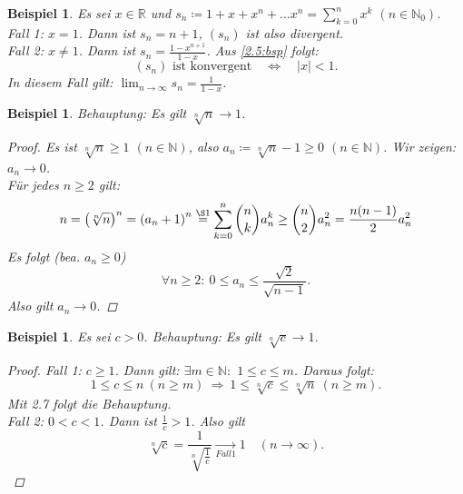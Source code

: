 \documentclass[12pt]{extreport} %
\newcommand{\N}{\mathbb{N}}
\newcommand{\R}{\mathbb{R}}
\theoremstyle{named}
\theoremstyle{itshape}
\theoremstyle{normal}
\newtheorem{beispiel}[unnamedtheorem]{Beispiel}
\begin{document}
\begin{beispiel} \label{2.6:bsp}
	Es sei $x \in \R$ und $s_{n} \coloneqq 1 + x + x^{n} + \dotsc x^{n} = \sum_{k = 0}^{n} x^{k}$ $(n \in \N_0)$. \\
	Fall 1: $x = 1$. Dann ist $s_{n} = n + 1$, $(s_{n})$ ist also divergent. \\
	Fall 2: $x \neq 1$. Dann ist  $s_{n} = \frac{1 - x^{n+1}}{1 - x}$. Aus \ref{2.5:bsp} folgt:
	$$
		(s_{n}) \text{ ist konvergent} \quad \iff \quad |x| < 1.
	$$
	In diesem Fall gilt: $\lim_{n \to \infty} s_{n} = \frac{1}{1 - x}$.
\end{beispiel}


\begin{beispiel} \label{2.7:bsp}
	Behauptung: Es gilt $\sqrt[n]{n} \rightarrow 1$.
	
	\begin{proof}
		Es ist $\sqrt[n]{n} \geq 1$ $(n \in \N)$, also $a_{n} \coloneqq \sqrt[n]{n} - 1 \geq 0$ $(n \in \N)$. Wir zeigen: $a_{n} \rightarrow 0$. \\
		Für jedes $n \geq 2$ gilt:
		$$
			n = \left( \sqrt[n]{n} \right)^{n} = \left( a_{n} + 1 \right)^{n} 
			\overset{\S 1}{=} \sum_{k=0}^{n} \binom{n}{k} a_{n}^{k} \geq \binom{n}{2} a_{n}^{2} = \frac{n(n-1)}{2} a_{n}^{2}
		$$
		Es folgt (bea. $a_n \ge 0$)
		$$\forall n\ge 2: ~ 0 \leq a_{n} \leq \frac{\sqrt{2}}{\sqrt{n-1}}.$$ Also gilt $a_{n} \rightarrow 0$.
	\end{proof}
\end{beispiel}


\begin{beispiel} \label{2.8:bsp}
	Es sei $c > 0$. Behauptung: Es gilt $\sqrt[n]{c} \rightarrow 1$.
	
	\begin{proof}
		Fall 1: $c \geq 1$. Dann gilt: $\exists m \in \N:$ $1 \leq c \leq m$. Daraus folgt:
		$$ 1 \leq c \leq n ~ (n \geq m) ~ \Rightarrow ~ 1 \leq \sqrt[n]{c} \leq \sqrt[n]{n} ~ (n\geq m). $$
		Mit 2.7 folgt die Behauptung. \\
		Fall 2: $0 < c < 1$. Dann ist $\frac{1}{c} > 1$. Also gilt
		$$\sqrt[n]{c} = \frac{1}{\sqrt[n]{\frac{1}{c}}} \xrightarrow[Fall 1]{} 1  \quad (n \rightarrow \infty).$$ 
	\end{proof}
\end{beispiel}
\end{document}
